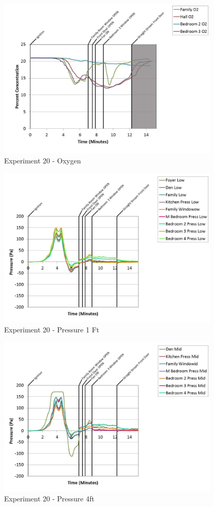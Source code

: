 \documentclass{article}
\begin{document}
\begin{appendices}
	\begin{figure}[h!]
		\centering
		\includegraphics[height=3.05in]{0_Images/Results_Charts/Exp_20_Charts/Oxygen.pdf}
		\caption{Experiment 20 - Oxygen}
	\end{figure}
 
	\clearpage

	\begin{figure}[h!]
		\centering
		\includegraphics[height=3.05in]{0_Images/Results_Charts/Exp_20_Charts/Pressure1Ft.pdf}
		\caption{Experiment 20 - Pressure 1 Ft}
	\end{figure}
 

	\begin{figure}[h!]
		\centering
		\includegraphics[height=3.05in]{0_Images/Results_Charts/Exp_20_Charts/Pressure4ft.pdf}
		\caption{Experiment 20 - Pressure 4ft}
	\end{figure}
 

\end{appendices}
\end{document}
